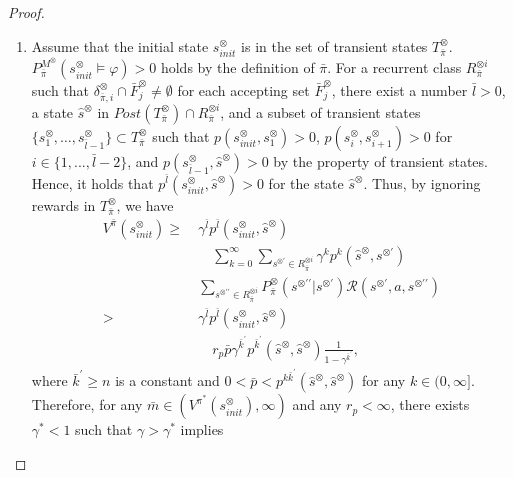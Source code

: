 \documentclass[letterpaper, 10 pt, conference]{ieeeconf}  %
\begin{document}
\begin{proof}
\begin{enumerate}
    \item Assume that the initial state $s^{\otimes}_{init}$ is in the set of transient states $T_{\bar{\pi}}^{\otimes}$.
    $P^{M^{\otimes}}_{\bar{\pi}}(s^{\otimes}_{init} \models \varphi) > 0$ holds by the definition of $\bar{\pi}$. For a recurrent class $R^{\otimes i}_{\bar{\pi}}$ such that $\delta^{\otimes}_{\bar{\pi}, i} \cap \bar{F}^{\otimes}_j \neq \emptyset$ for each accepting set
    $\bar{F}^{\otimes}_j$, there exist a number $\bar{l} > 0$, a state $\hat{s}^{\otimes}$ in $Post(T^{\otimes}_{\bar{\pi}}) \cap R^{\otimes i}_{\bar{\pi}}$, and a subset of transient states $\{ s^{\otimes}_1, \ldots , s^{\otimes}_{\bar{l}-1} \} \subset T^\otimes_{\bar{\pi}}$ such that $p(s^{\otimes}_{init}, s^{\otimes}_1)>0$, $p(s^{\otimes}_{i}, s^{\otimes}_{i+1})>0$ for $i \in \{ 1,...,\bar{l}-2 \}$, and $p(s^{\otimes}_{\bar{l}-1}, \hat{s}^{\otimes})>0$ by the property of transient states.
    Hence, it holds that $p^{\bar{l}}(s^{\otimes}_{init}, \hat{s}^{\otimes}) > 0$ for the state $\hat{s}^{\otimes}$. Thus, by ignoring rewards in $T^{\otimes}_{\bar{\pi}}$, we have
     \begin{align}
        V^{\bar{\pi}}(s^{\otimes}_{init}) %
        \geq\ & \gamma^{\bar{l}} p^{\bar{l}}(s^{\otimes}_{init}, \hat{s}^{\otimes}) \nonumber \\
        & \quad \sum_{k=0}^{\infty} \sum_{s^{\otimes \prime} \in R^{\otimes i}_{\bar{\pi}}} \gamma^k p^k(\hat{s}^{\otimes}, s^{\otimes \prime}) \nonumber \\
        & \sum_{s^{\otimes \prime \prime} \in R^{\otimes i}_{\bar{\pi}}} P^{\otimes}_{\bar{\pi}}(s^{\otimes \prime \prime} | s^{\otimes \prime}) \mathcal{R}(s^{\otimes \prime}, a, s^{\otimes \prime \prime}) \nonumber \\
        >\ & \gamma^{\bar{l}} p^{\bar{l}}(s^{\otimes}_{init}, \hat{s}^{\otimes}) \nonumber \\
        & \quad r_p \bar{p} \gamma^{\bar{k}^{\prime}}  p^{\bar{k}^{\prime}}(\hat{s}^{\otimes},\hat{s}^{\otimes}) \frac{1}{ 1 - \gamma^{\bar{k}^{\prime}} }, \nonumber
     \end{align}
     where $\bar{k}^{\prime}  \geq n$ is a constant and $0<\bar{p}< p^{k \bar{k}^{\prime}}(\hat{s}^{\otimes}, \hat{s}^{\otimes})$ for any $k \in (0, \infty]$.
     Therefore, for any $\bar{m} \in (V^{\pi^{\ast}}(s^{\otimes}_{init}), \infty)$ and any $r_p < \infty$, there exists $\gamma^{\ast}<1$ such that $\gamma > \gamma^{\ast}$ implies

\end{enumerate}
\end{proof}
\end{document}
